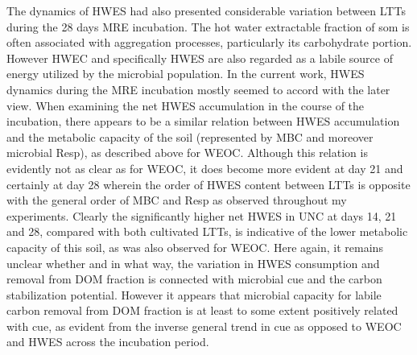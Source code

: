 \documentclass[12pt]{report}
\begin{document}
		
		The dynamics of HWES had also presented considerable variation between LTTs during the 28 days MRE incubation. The hot water extractable fraction of \gls{som} is often associated with aggregation processes, particularly its carbohydrate portion.  However HWEC and specifically HWES are also regarded as a labile source of energy utilized by the microbial population. In the current work, HWES dynamics during the MRE incubation mostly seemed to accord with the later view. When examining the net HWES accumulation in the course of the incubation, there appears to be a similar relation between HWES accumulation and the metabolic capacity of the soil (represented by MBC and moreover microbial Resp), as described above for WEOC. Although this relation is evidently not as clear as for WEOC, it does become more evident at day 21 and certainly at day 28 wherein the order of HWES content between LTTs is opposite with the general order of MBC and Resp as observed throughout my experiments. Clearly the significantly higher net HWES in UNC at days 14, 21 and 28, compared with both cultivated LTTs, is indicative of the lower metabolic capacity of this soil, as was also observed for WEOC. Here again, it remains unclear whether and in what way, the variation in HWES consumption and removal from DOM fraction is connected with microbial \gls{cue} and the carbon stabilization potential. However it appears that microbial capacity for labile carbon removal from DOM fraction is at least to some extent positively related with \gls{cue}, as evident from the inverse general trend in \gls{cue} as opposed to WEOC and HWES across the incubation period.
		



\end{document}
